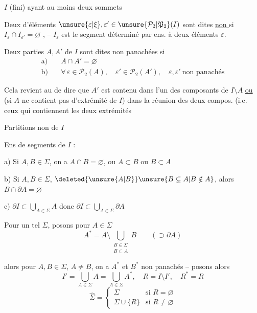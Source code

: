 $I$  (fini) ayant au moins deux sommets

Deux  d'éléments $\unsure{\varepsilon|\xi},\varepsilon'\in\unsure{\mathcal{P}_2|\mathfrak{P}_2}(I)$ sont dites \uline{non } si  $I_{\varepsilon}\cap I_{\varepsilon'}=\varnothing$ , -- $I_{\varepsilon}$ est le segment déterminé par  ens. à deux éléments $\varepsilon$.

Deux parties $A,A'$ de $I$ sont dites non panachées si \[\begin{aligned}\text{a)}\quad&A\cap A'=\varnothing\\ \text{b)}\quad&\forall\,\varepsilon\in\mathcal{P}_2(A),\quad\varepsilon'\in\mathcal{P}_2(A'),\quad \varepsilon,\varepsilon'\ \text{non panachés}\end{aligned}\]

\reversemarginpar{} Cela revient au \unsure{$=$} de dire que $A'$ est contenu dans l'un des  composants de $I\setminus A$ \uline{ou} (si $A$ ne contient pas d'extrémité de $I$) dans la réunion des deux compos.   (i.e. ceux qui contiennent  les deux extrémités

\normalmarginpar

Partitions non  de $I$

Ens \inserted{$\Sigma$} de segments de $I$  :

a) Si $A,B\in\Sigma$, on a $A\cap B=\varnothing$, ou $A\subset B$ ou $B\subset A$

b) Si $A,B\in\Sigma$, $\deleted{\unsure{A|B}}\unsure{B\subsetneq A|B\notin A}$, alors $B\cap\partial A=\varnothing$

c) \deleted{\unsure{$\forall$|$\forall\varepsilon$}} $\partial I\subset\bigcup\limits_{A\in\Sigma} A$ donc $\partial I\subset\bigcup\limits_{A\in\Sigma}\partial A$

Pour un tel $\Sigma$, posons pour $A\in\Sigma$ \[ A^{\ast}=A\setminus\bigcup_{\substack{B\in\Sigma\\B\subset A}} B \qquad (\supset\partial A) \] 

alors  pour $A,B\in\Sigma$, $A\ne B$, on a $A^{\ast}$ et $B^{\ast}$ non panachés -- posons  alors  \[ I'=\bigcup_{A\in\Sigma}A=\bigcup_{A\in\Sigma} A^{\ast},\quad R=I\setminus I',\quad R^{\ast}=R \] \[ \hat{\Sigma}=\begin{cases}\Sigma &\text{si }R=\varnothing\\ \Sigma\cup\{R\} &\text{si }R\ne\varnothing\end{cases} \]

